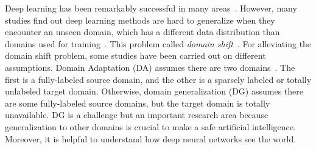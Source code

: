 Deep learning has been remarkably successful in many areas~\cite{}. However, many studies find out deep learning methods are hard to generalize when they encounter an unseen domain, which has a different data distribution than domains used for training~\cite{}. This problem called \textit{domain shift}~\cite{}. For alleviating the domain shift problem, some studies have been carried out on different assumptions. Domain Adaptation (DA) assumes there are two domains~\cite{}. The first is a fully-labeled source domain, and the other is a sparsely labeled or totally unlabeled target domain. Otherwise, domain generalization (DG) assumes there are some fully-labeled source domains, but the target domain is totally unavailable. DG is a challenge but an important research area because generalization to other domains is crucial to make a safe artificial intelligence. Moreover, it is helpful to understand how deep neural networks see the world.

